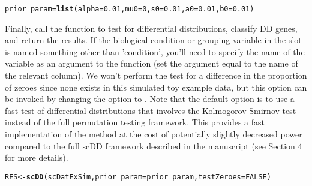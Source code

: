\documentclass{article}\usepackage[]{graphicx}\usepackage[]{color}
\makeatletter
\newcommand{\hlnum}[1]{\textcolor[rgb]{0.686,0.059,0.569}{#1}}%
\newcommand{\hlstd}[1]{\textcolor[rgb]{0.345,0.345,0.345}{#1}}%
\newcommand{\hlkwb}[1]{\textcolor[rgb]{0.69,0.353,0.396}{#1}}%
\newcommand{\hlkwc}[1]{\textcolor[rgb]{0.333,0.667,0.333}{#1}}%
\newcommand{\hlkwd}[1]{\textcolor[rgb]{0.737,0.353,0.396}{\textbf{#1}}}%
\newenvironment{kframe}{%
 \def\at@end@of@kframe{}%
 \ifinner\ifhmode%
  \def\at@end@of@kframe{\end{minipage}}%
  \begin{minipage}{\columnwidth}%
 \fi\fi%
 \def\FrameCommand##1{\hskip\@totalleftmargin \hskip-\fboxsep
 \colorbox{shadecolor}{##1}\hskip-\fboxsep
     \hskip-\linewidth \hskip-\@totalleftmargin \hskip\columnwidth}%
 \MakeFramed {\advance\hsize-\width
   \@totalleftmargin\z@ \linewidth\hsize
   \@setminipage}}%
 {\par\unskip\endMakeFramed%
 \at@end@of@kframe}
\newenvironment{knitrout}{}{} %
\makeatother
\begin{document}
\begin{knitrout}
\color{fgcolor}\begin{kframe}
\begin{alltt}
\hlstd{prior_param}\hlkwb{=}\hlkwd{list}\hlstd{(}\hlkwc{alpha}\hlstd{=}\hlnum{0.01}\hlstd{,} \hlkwc{mu0}\hlstd{=}\hlnum{0}\hlstd{,} \hlkwc{s0}\hlstd{=}\hlnum{0.01}\hlstd{,} \hlkwc{a0}\hlstd{=}\hlnum{0.01}\hlstd{,} \hlkwc{b0}\hlstd{=}\hlnum{0.01}\hlstd{)}
\end{alltt}
\end{kframe}
\end{knitrout}
 
Finally, call the  function to test for differential distributions, classify DD genes, and return the results.  If the biological condition or grouping variable in the  slot is named something other than 'condition', you'll need to specify the name of the variable as an argument to the  function (set the  argument equal to the name of the relevant column).  We won't perform the test for a difference in the proportion of zeroes since none exists in this simulated toy example data, but this option can be invoked by changing the  option to .  Note that the default option is to use a fast test of differential distributions that involves the Kolmogorov-Smirnov test instead of the full permutation testing framework.  This provides a fast implementation of the method at the cost of potentially slightly decreased power compared to the full scDD framework described in the manuscript (see Section 4 for more details).

\begin{knitrout}
\color{fgcolor}\begin{kframe}
\begin{alltt}
\hlstd{RES} \hlkwb{<-} \hlkwd{scDD}\hlstd{(scDatExSim,} \hlkwc{prior_param}\hlstd{=prior_param,} \hlkwc{testZeroes}\hlstd{=}\hlnum{FALSE}\hlstd{)}
\end{alltt}


{\ttfamily\noindent\itshape\color{messagecolor}{\#\# Clustering observed expression data for each gene}}

{\ttfamily\noindent\itshape\color{messagecolor}{\#\# Setting up parallel back-end using 4 cores}}

{\ttfamily\noindent\itshape\color{messagecolor}{\#\# Notice! Number of permutations is set to zero; using Kolmogorov-Smirnov to test for differences in distributions instead of the Bayes Factor permutation test}}

{\ttfamily\noindent\itshape\color{messagecolor}{\#\# Classifying significant genes into patterns}}\end{kframe}
\end{knitrout}
\end{document}
